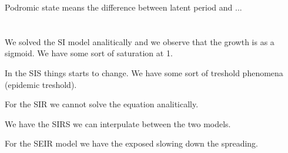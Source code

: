 \documentclass[../main/main.tex]{subfiles}
\begin{document}
Podromic state means the difference between latent period and ...


\section{}
We solved the SI model analitically and we observe that the growth is as a sigmoid. We have some sort of saturation at 1.

In the SIS things starts to change. We have some sort of treshold phenomena (epidemic treshold).

For the SIR we cannot solve the equation analitically.

We have the SIRS we can interpulate between the two models.

For the SEIR model we have the exposed slowing down the spreading.
\end{document}
